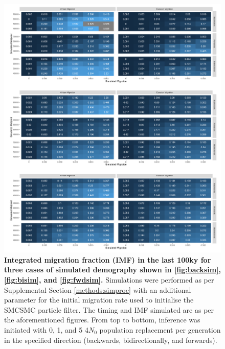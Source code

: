 \begin{figure}
	\centering
	\includegraphics[width=\textwidth]{plot/all_integrated_sims.pdf}
	\caption[Integrated migration for three cases of simulated demographies]{ {\bf Integrated migration fraction (IMF) in the last 100ky for three cases of simulated demography shown in \ref{fig:backsim}, \ref{fig:bisim}, and \ref{fig:fwdsim}.} Simulations were performed as per Supplemental Section \ref{methods:simproc} with an additional parameter for the initial migration rate used to initialise the SMCSMC particle filter. The timing and IMF simulated are as per the aforementioned figures. From top to bottom, inference was initiated with 0, 1, and 5 4$N_0$ population replacement per generation in the specified direction (backwards, bidirectionally, and forwards).}
	\label{fig:intsim}
\end{figure}

